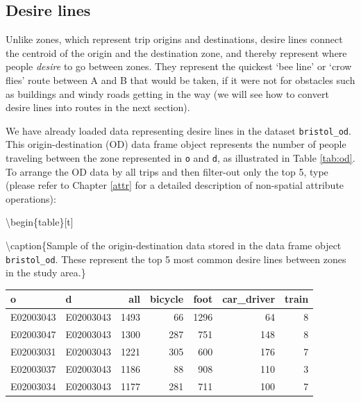 \documentclass[]{krantz}
\newenvironment{Shaded}{\begin{snugshade}}{\end{snugshade}}
\newcommand{\DataTypeTok}[1]{\textcolor[rgb]{0.27,0.27,0.27}{#1}}
\newcommand{\DecValTok}[1]{\textcolor[rgb]{0.06,0.06,0.06}{#1}}
\newcommand{\KeywordTok}[1]{\textcolor[rgb]{0.27,0.27,0.27}{\textbf{#1}}}
\newcommand{\NormalTok}[1]{#1}
\newcommand{\OperatorTok}[1]{\textcolor[rgb]{0.43,0.43,0.43}{\textbf{#1}}}
\newcommand{\StringTok}[1]{\textcolor[rgb]{0.5,0.5,0.5}{#1}}
\begin{document}
\hypertarget{desire-lines}{%
\subsection{Desire lines}\label{desire-lines}}

Unlike zones, which represent trip origins and destinations, desire lines connect the centroid of the origin and the destination zone, and thereby represent where people \emph{desire} to go between zones.
They represent the quickest `bee line' or `crow flies' route between A and B that would be taken, if it were not for obstacles such as buildings and windy roads getting in the way (we will see how to convert desire lines into routes in the next section).

We have already loaded data representing desire lines in the dataset \texttt{bristol\_od}.
This origin-destination (OD) data frame object represents the number of people traveling between the zone represented in \texttt{o} and \texttt{d}, as illustrated in Table \ref{tab:od}.
To arrange the OD data by all trips and then filter-out only the top 5, type (please refer to Chapter \ref{attr} for a detailed description of non-spatial attribute operations):

\begin{Shaded}
\end{Shaded}

\textbackslash{}begin\{table\}{[}t{]}

\textbackslash{}caption\{\label{tab:od}Sample of the origin-destination data stored in the data frame object \texttt{bristol\_od}. These represent the top 5 most common desire lines between zones in the study area.\}
\centering

\begin{tabular}{llrrrrr}
\toprule
o & d & all & bicycle & foot & car\_driver & train\\
\midrule
E02003043 & E02003043 & 1493 & 66 & 1296 & 64 & 8\\
E02003047 & E02003043 & 1300 & 287 & 751 & 148 & 8\\
E02003031 & E02003043 & 1221 & 305 & 600 & 176 & 7\\
E02003037 & E02003043 & 1186 & 88 & 908 & 110 & 3\\
E02003034 & E02003043 & 1177 & 281 & 711 & 100 & 7\\
\bottomrule
\end{tabular}
\end{document}
